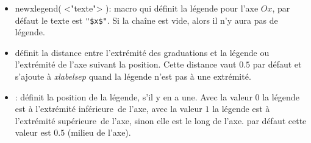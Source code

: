 \begin{itemize}
\begin{itemize}
  \item \textcolor{\coloropt}{newxlegend( <"texte"> )}: macro qui définit la légende pour l'axe $Ox$, par défaut le texte est \verb|"$x$"|. Si la chaîne est vide, alors il n'y aura pas de légende.
  \item {} définit la distance entre l'extrémité des graduations et la légende ou l'extrémité de l'axe suivant la position. Cette distance vaut $0.5$ par défaut et s'ajoute à \textit{xlabelsep} quand la légende n'est pas à une extrémité.
  \item {}: définit la position de la légende, s'il y en a une. Avec la valeur $0$ la légende est à l'extrémité \og inférieure\fg\ de l'axe, avec la valeur $1$ la légende est à l'extrémité \og supérieure\fg\ de l'axe, sinon elle est le long de l'axe. par défaut cette valeur est $0.5$ (milieu de l'axe).
  \end{itemize}
\end{itemize}


